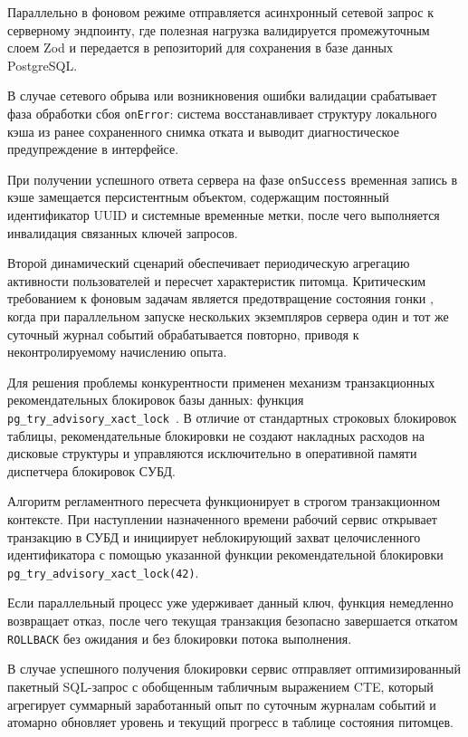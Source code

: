 \documentclass[a4paper,14pt]{extreport}
\begin{document}
Параллельно в фоновом режиме отправляется асинхронный сетевой запрос к серверному эндпоинту, где полезная нагрузка валидируется промежуточным слоем Zod и передается в репозиторий для сохранения в базе данных PostgreSQL.

В случае сетевого обрыва или возникновения ошибки валидации срабатывает фаза обработки сбоя \texttt{onError}: система восстанавливает структуру локального кэша из ранее сохраненного снимка отката и выводит диагностическое предупреждение в интерфейсе.

При получении успешного ответа сервера на фазе \texttt{onSuccess} временная запись в кэше замещается персистентным объектом, содержащим постоянный идентификатор UUID и системные временные метки, после чего выполняется инвалидация связанных ключей запросов.

Второй динамический сценарий обеспечивает периодическую агрегацию активности пользователей и пересчет характеристик питомца. Критическим требованием к фоновым задачам является предотвращение состояния гонки , когда при параллельном запуске нескольких экземпляров сервера один и тот же суточный журнал событий обрабатывается повторно, приводя к неконтролируемому начислению опыта.

Для решения проблемы конкурентности применен механизм транзакционных рекомендательных блокировок базы данных: функция \texttt{pg\_\allowbreak try\_\allowbreak advisory\_\allowbreak xact\_\allowbreak lock}~\cite{ref18, ref19, ref20}. В отличие от стандартных строковых блокировок таблицы, рекомендательные блокировки не создают накладных расходов на дисковые структуры и управляются исключительно в оперативной памяти диспетчера блокировок СУБД.

Алгоритм регламентного пересчета функционирует в строгом транзакционном контексте. При наступлении назначенного времени рабочий сервис открывает транзакцию в СУБД и инициирует неблокирующий захват целочисленного идентификатора с помощью указанной функции рекомендательной блокировки \texttt{pg\_\allowbreak try\_\allowbreak advisory\_\allowbreak xact\_\allowbreak lock(42)}.

Если параллельный процесс уже удерживает данный ключ, функция немедленно возвращает отказ, после чего текущая транзакция безопасно завершается откатом \texttt{ROLLBACK} без ожидания и без блокировки потока выполнения.

В случае успешного получения блокировки сервис отправляет оптимизированный пакетный SQL-запрос с обобщенным табличным выражением CTE, который агрегирует суммарный заработанный опыт по суточным журналам событий и атомарно обновляет уровень и текущий прогресс в таблице состояния питомцев.
\end{document}

